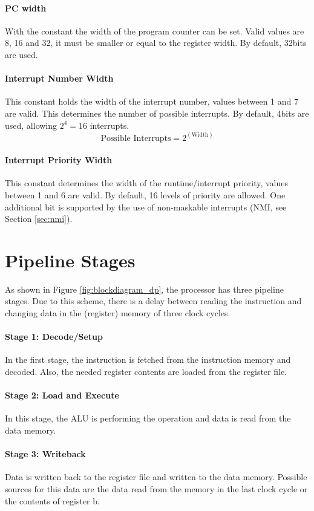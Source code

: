 \paragraph{PC width}
With the constant  the width of the program counter can be set.
Valid values are 8, 16 and 32, it must be smaller or equal to the register width.
By default, 32bits are used.
\paragraph{Interrupt Number Width}
This constant holds the width of the interrupt number, values between 1 and 7 are valid.
This determines the number of possible interrupts.
By default, 4bits are used, allowing $2^4 = 16$ interrupts. 
\begin{equation*}
\text{Possible Interrupts} = 2^{(\text{Width})}
\end{equation*}
\paragraph{Interrupt Priority Width}
\label{sec:config_priowidth}
This constant determines the width of the runtime/interrupt priority, values between 1 and 6 are valid.
By default, 16 levels of priority are allowed.
One additional bit is supported by the use of non-maskable interrupts (NMI, see Section \ref{sec:nmi}).

\section{Pipeline Stages}
As shown in Figure \ref{fig:blockdiagram_dp}, the processor has three pipeline stages.
Due to this scheme, there is a delay between reading the instruction and changing data in the (register) memory of three clock cycles.

\paragraph{Stage 1: Decode/Setup}
In the first stage, the instruction is fetched from the instruction memory and decoded. Also, the needed register contents are loaded from the register file.
\paragraph{Stage 2: Load and Execute}
In this stage, the ALU is performing the operation and data is read from the data memory.
\paragraph{Stage 3: Writeback}
Data is written back to the register file and written to the data memory.
Possible sources for this data are the data read from the memory in the last clock cycle or the contents of register b.

